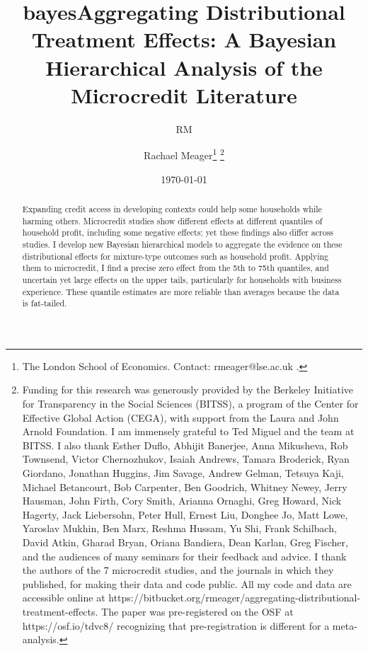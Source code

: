 \documentclass[english,12pt]{article}\usepackage{lmodern}
\title{bayes}
\author{RM}
\numberwithin{equation}{section}
\begin{document}
\title{Aggregating Distributional Treatment Effects: A Bayesian Hierarchical Analysis of the Microcredit Literature }
\author{Rachael Meager\footnote{\scriptsize The London School of Economics. Contact: rmeager@lse.ac.uk .} \thanks{\scriptsize Funding for this research was generously provided by the Berkeley Initiative for Transparency in the Social Sciences (BITSS), a program of the Center for Effective Global Action (CEGA), with support from the Laura and John Arnold Foundation. I am immensely grateful to Ted Miguel and the team at BITSS. I also thank Esther Duflo, Abhijit Banerjee, Anna Mikusheva, Rob Townsend, Victor Chernozhukov, Isaiah Andrews, Tamara Broderick, Ryan Giordano, Jonathan Huggins, Jim Savage, Andrew Gelman, Tetsuya Kaji, Michael Betancourt, Bob Carpenter, Ben Goodrich, Whitney Newey, Jerry Hausman, John Firth, Cory Smith, Arianna Ornaghi, Greg Howard, Nick Hagerty, Jack Liebersohn, Peter Hull, Ernest Liu, Donghee Jo, Matt Lowe, Yaroslav Mukhin, Ben Marx, Reshma Hussam, Yu Shi, Frank Schilbach, David Atkin, Gharad Bryan, Oriana Bandiera, Dean Karlan, Greg Fischer, and the audiences of many seminars for their feedback and advice. I thank the authors of the 7 microcredit studies, and the journals in which they published, for making their data and code public. All my code and data are accessible online at https://bitbucket.org/rmeager/aggregating-distributional-treatment-effects. The paper was pre-registered on the OSF at https://osf.io/tdvc8/ recognizing that pre-registration is different for a meta-analysis. }}
\date{\today}
\maketitle
\begin{abstract} %
Expanding credit access in developing contexts could help some households while harming others. Microcredit studies show different effects at different quantiles of household profit, including some negative effects; yet these findings also differ across studies. I develop new Bayesian hierarchical models to aggregate the evidence on these distributional effects for mixture-type outcomes such as household profit. Applying them to microcredit, I find a precise zero effect from the 5th to 75th quantiles, and uncertain yet large effects on the upper tails, particularly for households with business experience. These quantile estimates are more reliable than averages because the data is fat-tailed.
\end{abstract}
\end{document}
